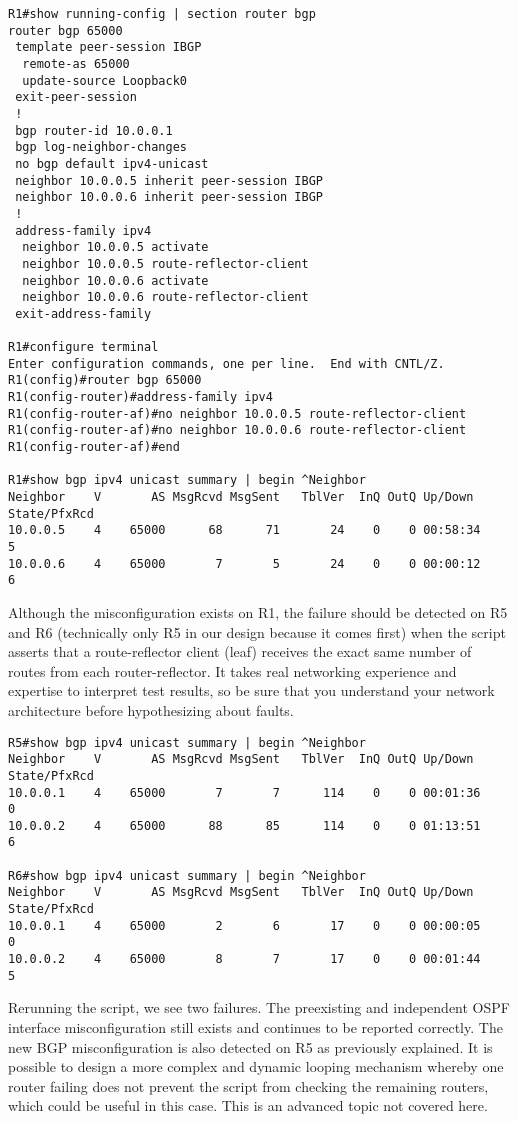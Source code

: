 \begin{verbatim}
R1#show running-config | section router bgp
router bgp 65000
 template peer-session IBGP
  remote-as 65000
  update-source Loopback0
 exit-peer-session
 !
 bgp router-id 10.0.0.1
 bgp log-neighbor-changes
 no bgp default ipv4-unicast
 neighbor 10.0.0.5 inherit peer-session IBGP
 neighbor 10.0.0.6 inherit peer-session IBGP
 !
 address-family ipv4
  neighbor 10.0.0.5 activate
  neighbor 10.0.0.5 route-reflector-client
  neighbor 10.0.0.6 activate
  neighbor 10.0.0.6 route-reflector-client
 exit-address-family

R1#configure terminal
Enter configuration commands, one per line.  End with CNTL/Z.
R1(config)#router bgp 65000
R1(config-router)#address-family ipv4
R1(config-router-af)#no neighbor 10.0.0.5 route-reflector-client
R1(config-router-af)#no neighbor 10.0.0.6 route-reflector-client
R1(config-router-af)#end

R1#show bgp ipv4 unicast summary | begin ^Neighbor
Neighbor    V       AS MsgRcvd MsgSent   TblVer  InQ OutQ Up/Down  State/PfxRcd
10.0.0.5    4    65000      68      71       24    0    0 00:58:34        5
10.0.0.6    4    65000       7       5       24    0    0 00:00:12        6
\end{verbatim}

Although the misconfiguration exists on R1, the failure should be detected on R5
and R6 (technically only R5 in our design because it comes first)
when the script asserts that a route-reflector client (leaf) receives the exact
same number of routes from each router-reflector. It takes real networking
experience and expertise to interpret test results, so be sure that you
understand your network architecture before hypothesizing about faults.

\begin{verbatim}
R5#show bgp ipv4 unicast summary | begin ^Neighbor
Neighbor    V       AS MsgRcvd MsgSent   TblVer  InQ OutQ Up/Down  State/PfxRcd
10.0.0.1    4    65000       7       7      114    0    0 00:01:36        0
10.0.0.2    4    65000      88      85      114    0    0 01:13:51        6

R6#show bgp ipv4 unicast summary | begin ^Neighbor
Neighbor    V       AS MsgRcvd MsgSent   TblVer  InQ OutQ Up/Down  State/PfxRcd
10.0.0.1    4    65000       2       6       17    0    0 00:00:05        0
10.0.0.2    4    65000       8       7       17    0    0 00:01:44        5
\end{verbatim}

Rerunning the script, we see two failures. The preexisting and independent OSPF
interface misconfiguration still exists and continues to be reported correctly.
The new BGP misconfiguration is also detected on R5 as previously explained. It
is possible to design a more complex and dynamic looping mechanism whereby one
router failing does not prevent the script from checking the remaining routers,
which could be useful in this case. This is an advanced topic not covered here.

